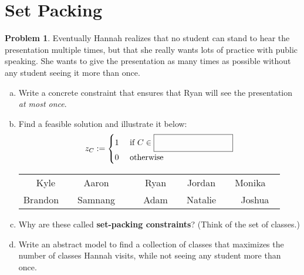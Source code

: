 \documentclass[11pt]{article}
\theoremstyle{definition}
\newtheorem{problem}{Problem}
\newcommand{\answerbox}[3]{%
  \fbox{%
    \begin{minipage}[#1]{#2}
      \hfill\vspace{#3}
    \end{minipage}
  }
}
\newcommand{\wordbox}{\answerbox{c}{1.2in}{.5cm}}
\begin{document}
\section{Set Packing}
\begin{problem}
Eventually Hannah realizes that no student can stand to hear the presentation multiple times, but that she really wants lots of practice with public speaking.  She wants to give the presentation as many times as possible without any student seeing it more than once.
\begin{enumerate}[a.]
\item Write a concrete constraint that ensures that Ryan will see the presentation \emph{at most once}.

\vfill
\item Find a feasible solution and illustrate it below:
\[
z_{C} :=
\begin{cases}
1 & \text{ if } C \in \wordbox \\
0 & \text{ otherwise } 
\end{cases}
\]

\begin{tcolorbox}
\begin{center}
\def\arraystretch{1.5}
\setlength{\tabcolsep}{12pt}
\begin{tabular}{ccccc}
Kyle & Aaron~~ & Ryan & Jordan~~ & Monika~~ \\ Brandon~~ & Samnang~~ & ~~Adam~~ & Natalie~~ & Joshua 
\end{tabular}
\end{center}
\end{tcolorbox}
\bigskip
\item Why are these called {\bf set-packing constraints}?  (Think of the set of classes.)
\vfill
\item  Write an abstract model to find a collection of classes that maximizes the number of classes Hannah visits, while not seeing any student more than once. 
\vfill
\vfill
\end{enumerate}
\end{problem}

\newpage
\end{document}

